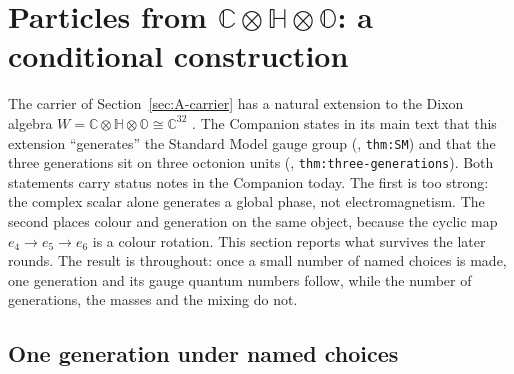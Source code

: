 \section{Particles from \texorpdfstring{$\mathbb C\otimes\mathbb H\otimes\mathbb O$}{C x H x O}: a conditional construction}
\label{sec:B-particles}

The carrier of Section~\ref{sec:A-carrier} has a natural extension to the Dixon algebra
$W=\mathbb C\otimes\mathbb H\otimes\mathbb O\cong\mathbb C^{32}$ \cite{Dixon1994}. The Companion states in its main text that
this extension ``generates'' the Standard Model gauge group (\cite{QSC}, \texttt{thm:SM}) and that the three generations
sit on three octonion units (\cite{QSC}, \texttt{thm:three-generations}). Both statements carry status notes in the
Companion today. The first is too strong: the complex scalar alone generates a global phase, not electromagnetism. The
second places colour and generation on the same object, because the cyclic map $e_4\to e_5\to e_6$ is a colour rotation.
This section reports what survives the later rounds. The result is \Conditional{} throughout: once a small number of named
choices is made, one generation and its gauge quantum numbers follow, while the number of generations, the masses and the
mixing do not.

\subsection{One generation under named choices}
\label{sec:B-one-generation}

